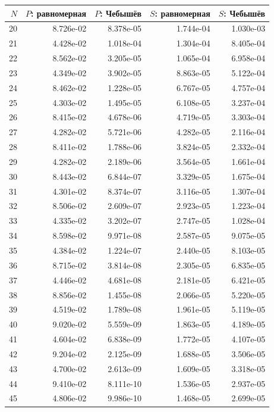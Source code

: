 \documentclass[12pt,a4paper]{article}
\begin{document}
\begingroup\small\renewcommand{\arraystretch}{0.93}
\begin{longtable}{rrrrr}\toprule
$N$ & $P$: равномерная & $P$: Чебышёв & $S$: равномерная & $S$: Чебышёв\\\midrule\endhead
20 & 8.726e-02 & 8.378e-05 & 1.744e-04 & 1.030e-03\\
21 & 4.428e-02 & 1.018e-04 & 1.304e-04 & 8.405e-04\\
22 & 8.562e-02 & 3.205e-05 & 1.065e-04 & 6.958e-04\\
23 & 4.349e-02 & 3.902e-05 & 8.863e-05 & 5.122e-04\\
24 & 8.462e-02 & 1.228e-05 & 6.767e-05 & 4.757e-04\\
25 & 4.303e-02 & 1.495e-05 & 6.108e-05 & 3.237e-04\\
26 & 8.415e-02 & 4.678e-06 & 4.719e-05 & 3.303e-04\\
27 & 4.282e-02 & 5.721e-06 & 4.282e-05 & 2.116e-04\\
28 & 8.411e-02 & 1.788e-06 & 3.824e-05 & 2.332e-04\\
29 & 4.282e-02 & 2.189e-06 & 3.564e-05 & 1.661e-04\\
30 & 8.443e-02 & 6.844e-07 & 3.329e-05 & 1.675e-04\\
31 & 4.301e-02 & 8.374e-07 & 3.116e-05 & 1.307e-04\\
32 & 8.506e-02 & 2.609e-07 & 2.923e-05 & 1.223e-04\\
33 & 4.335e-02 & 3.202e-07 & 2.747e-05 & 1.028e-04\\
34 & 8.598e-02 & 9.971e-08 & 2.587e-05 & 9.075e-05\\
35 & 4.384e-02 & 1.224e-07 & 2.440e-05 & 8.103e-05\\
36 & 8.715e-02 & 3.814e-08 & 2.305e-05 & 6.835e-05\\
37 & 4.446e-02 & 4.681e-08 & 2.181e-05 & 6.421e-05\\
38 & 8.856e-02 & 1.455e-08 & 2.066e-05 & 5.220e-05\\
39 & 4.519e-02 & 1.789e-08 & 1.961e-05 & 5.119e-05\\
40 & 9.020e-02 & 5.559e-09 & 1.863e-05 & 4.189e-05\\
41 & 4.604e-02 & 6.838e-09 & 1.772e-05 & 4.107e-05\\
42 & 9.204e-02 & 2.125e-09 & 1.688e-05 & 3.506e-05\\
43 & 4.700e-02 & 2.613e-09 & 1.609e-05 & 3.318e-05\\
44 & 9.410e-02 & 8.111e-10 & 1.536e-05 & 2.937e-05\\
45 & 4.806e-02 & 9.986e-10 & 1.468e-05 & 2.699e-05\\

\end{longtable}
\end{document}
